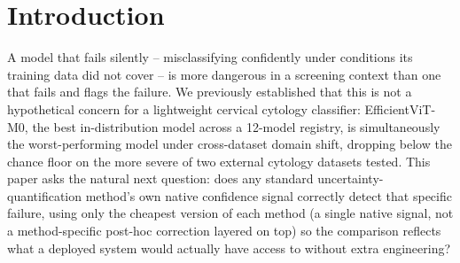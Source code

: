 \documentclass[runningheads]{llncs}
\begin{document}
\begin{abstract}
\end{abstract}

\section{Introduction}

A model that fails silently -- misclassifying confidently under
conditions its training data did not cover -- is more dangerous in a
screening context than one that fails and flags the failure. We previously
established that this is not a hypothetical concern for a lightweight
cervical cytology classifier: EfficientViT-M0, the best in-distribution
model across a 12-model registry, is simultaneously the worst-performing
model under cross-dataset domain shift, dropping below the chance floor on
the more severe of two external cytology datasets tested. This paper asks
the natural next question: does any standard uncertainty-quantification
method's own native confidence signal correctly detect that specific
failure, using only the cheapest version of each method (a single native
signal, not a method-specific post-hoc correction layered on top) so the
comparison reflects what a deployed system would actually have access to
without extra engineering?
\end{document}
